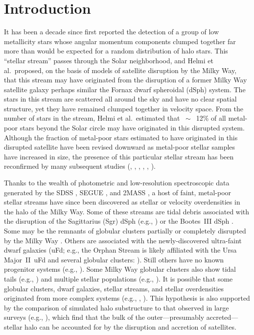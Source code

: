 \documentclass{emulateapj}
\begin{document}
\section{Introduction}
\label{intro}


It has been a decade since \citet{helmi99b} first reported the detection
of a group of low metallicity stars whose angular momentum components
clumped together far more than would be expected for a random distribution 
of halo stars.  
This ``stellar stream'' passes through the Solar neighborhood, and 
Helmi et al.\ proposed, on the basis of models of satellite
disruption by the Milky Way, that this stream may have originated
from the disruption of a former Milky Way satellite galaxy perhaps similar 
the Fornax dwarf spheroidal (dSph) system.
The stars in this stream are scattered all around the sky and have no clear 
spatial structure, yet they have remained clumped together in velocity space.
From the number of stars in the stream, Helmi et al.\ estimated that
$~\sim$~12\% of all metal-poor stars beyond the Solar circle may have 
originated in this disrupted system.
Although the fraction of metal-poor stars estimated to have originated in
this disrupted satellite have been revised downward as metal-poor 
stellar samples have increased in size, the presence of this particular
stellar stream has been reconfirmed
by many subsequent studies (\citealt{chiba00}, \citealt{refiorentin05},
\citealt{dettbarn07}, \citealt{kepley07}, \citealt{klement09}, 
\citealt{smith09}).

Thanks to the wealth of photometric and low-resolution spectroscopic
data generated by the SDSS \citep{york00},
SEGUE \citep{yanny09}, and 2MASS \citep{skrutskie06},
a host of faint, metal-poor
stellar streams have since been discovered as stellar or 
velocity overdensities in the halo of the Milky Way.
Some of these streams are tidal debris 
associated with the disruption of the Sagittarius (Sgr) dSph 
(e.g., \citealt{vivas01,newberg02,majewski03,martinezdelgado04,belokurov06b})
or the Bootes~III dSph \citep{carlin09,grillmair09}.
Some may be the remnants of globular clusters partially or 
completely disrupted by the Milky Way 
\citep{grillmair09,newberg09}.
Others are associated with the newly-discovered ultra-faint dwarf 
galaxies (uFd; e.g., the Orphan Stream is likely affiliated with
the Ursa Major~II~uFd and several globular clusters: 
\citealt{grillmair06c,zucker06,belokurov07b}).
Still others have no known progenitor systems (e.g., \citealt{klement09}).
Some Milky Way globular clusters also show tidal tails (e.g., 
\citealt{grillmair95,odenkirchen01,grillmair06a,belokurov06a}) and 
multiple stellar populations 
(e.g., \citealt{lee99,piotto07,milone08,dacosta09,han09}).
It is possible that
some globular clusters, dwarf galaxies, stellar streams, and 
stellar overdensities originated from more complex systems
(e.g., \citealt{lyndenbell95}, \citealt{lee07}).
This hypothesis is also supported by the
comparison of simulated halo substructure to that observed 
in large surveys (e.g., \citealt{bell08,starkenburg09}), which
find that the bulk of the outer---presumably 
accreted---stellar halo can be accounted for by the 
disruption and accretion of satellites.
\end{document}
